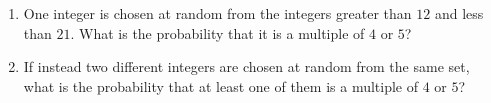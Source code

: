 \begin{enumerate}
\item[(a)] One integer is chosen at random from the integers greater than $12$ and less than $21$. What is the probability that it is a multiple of $4$ or $5$?
\item[(b)] If instead two different integers are chosen at random from the same set, what is the probability that at least one of them is a multiple of $4$ or $5$?
\end{enumerate}
